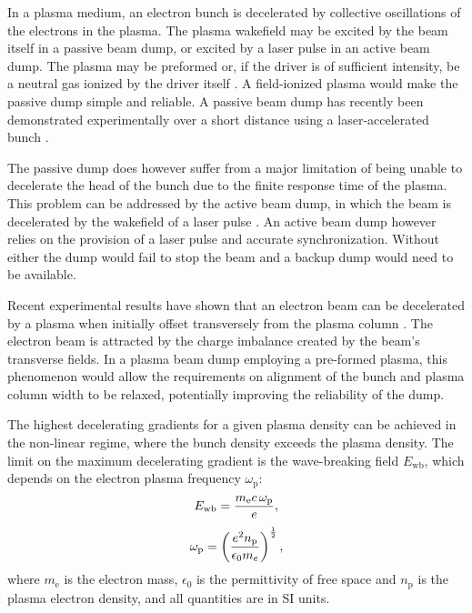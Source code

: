 \documentclass[aip,pop,preprint,superscriptaddress]{revtex4-1}
\begin{document}
In a plasma medium, an electron bunch is decelerated by collective oscillations of the electrons in the plasma. The plasma wakefield may be excited by the beam itself in a passive beam dump, or excited by a laser pulse in an active beam dump. The plasma may be preformed or, if the driver is of sufficient intensity, be a neutral gas ionized by the driver itself \cite{Hogan}. A field-ionized plasma would make the passive dump simple and reliable. A passive beam dump has recently been demonstrated experimentally over a short distance using a laser-accelerated bunch \cite{Chou_thesis,Chou}.

The passive dump does however suffer from a major limitation of being unable to decelerate the head of the bunch due to the finite response time of the plasma. This problem can be addressed by the active beam dump, in which the beam is decelerated by the wakefield of a laser pulse \cite{Bonatto}. An active beam dump however relies on the provision of a laser pulse and accurate synchronization. Without either the dump would fail to stop the beam and a backup dump would need to be available.

Recent experimental results have shown that an electron beam can be decelerated by a plasma when initially offset transversely from the plasma column \cite{Adli}. The electron beam is attracted by the charge imbalance created by the beam's transverse fields. In a plasma beam dump employing a pre-formed plasma, this phenomenon would allow the requirements on alignment of the bunch and plasma column width to be relaxed, potentially improving the reliability of the dump.

The highest decelerating gradients for a given plasma density can be achieved in the non-linear regime, where the bunch density exceeds the plasma density. The limit on the maximum decelerating gradient is the wave-breaking field $E_{\mathrm{wb}}$, which depends on the electron plasma frequency $\omega_{\mathrm{p}}$:
\begin{equation}
  \label{wavebreaking_field}
  E_{\mathrm{wb}} = {{m_{\mathrm e} c \,\omega_{\mathrm p}}\over{e}},
\end{equation}
\begin{equation}
  \omega_{\mathrm{p}}=\left({{e^2 n_\mathrm{p}}\over{\epsilon_0 m_e}}\right)^{1\over2},
\end{equation}
where $m_{\mathrm{e}}$ is the electron mass, $\epsilon_0$ is the permittivity of free space and $n_{\mathrm{p}}$ is the plasma electron density, and all quantities are in SI units.
\end{document}
